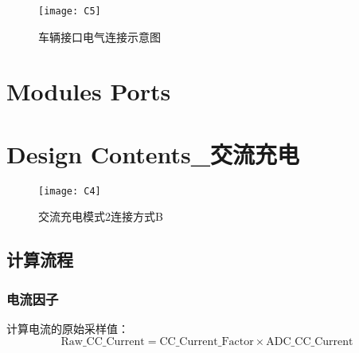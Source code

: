 \begin{figure}[!htbp]
    \centering
    \texttt{[image: C5]}
    \caption{车辆接口电气连接示意图}
    \label{fig:C5}
\end{figure}

\section{Modules Ports}


\section{Design Contents\_交流充电}








\begin{figure}[!htbp]
    \centering
    \texttt{[image: C4]}
    \caption{交流充电模式2连接方式B\cite{GB18487_1}}
    \label{fig:C4}
\end{figure}



\subsection{计算流程}
\subsubsection*{电流因子}
        计算电流的原始采样值：
            \begin{equation}
                \mathrm{Raw\_CC\_Current} = \mathrm{CC\_Current\_Factor} \times  \mathrm{ADC\_CC\_Current}
                \label{eq:CC1}
            \end{equation}

